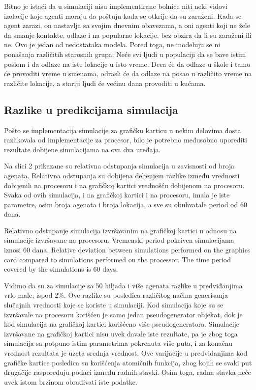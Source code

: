 Bitno je istaći da u simulaciji nisu implementirane bolnice niti neki vidovi izolacije koje agenti moraju da poštuju kada se otkrije da su zaraženi. Kada se agent zarazi, on nastavlja sa svojim dnevnim obavezama, a oni agenti koji ne žele da smanje kontakte, odlaze i na popularne lokacije, bez obzira da li su zaraženi ili ne. Ovo je jedan od nedostataka modela. Pored toga, ne modeluju se ni ponašanja različitih starosnih grupa. Neće svi ljudi u populaciji da se bave istim poslom i da odlaze na iste lokacije u isto vreme. Deca će da odlaze u škole i tamo će provoditi vreme u smenama, odrasli će da odlaze na posao u različito vreme na različite lokacije, a stariji ljudi će većinu dana provoditi u kućama.

\subsection{Razlike u predikcijama simulacija}

Pošto se implementacija simulacije za grafičku karticu u nekim delovima dosta razlikovala od implementacije za procesor, bilo je potrebno međusobno uporediti rezultate dobijene simulacijama na ova dva uređaja.

Na slici 2 prikazane su relativna odstupanja simulacija u zavisnosti od broja agenata. Relativna odstupanja su dobijena deljenjem razlike između vrednosti dobijenih na procesoru i na grafičkoj kartici vrednošću dobijenom na procesoru. Svaka od ovih simulacija, i na grafičkoj kartici i na procesoru, imala je iste parametre, osim broja agenata i broja lokacija, a sve su obuhvatale period od 60 dana.

    {Relativno odstupanje simulacija izvršavanim na grafičkoj kartici u odnosu na simulacije izvršavane na procesoru. Vremenski period pokriven simulacijama iznosi 60 dana.}
    {Relative deviation between simulations performed on the graphics card compared to simulations performed on the processor. The time period covered by the simulations is 60 days.}

Vidimo da su za simulacije sa 50 hiljada i više agenata razlike u predviđanjima vrlo male, ispod 2\%. Ove razlike su posledica različitog načina generisanja slučajnih vrednosti koje se koriste u simulaciji. Kod simulacija koje su se izvršavale na procesoru korišćen je samo jedan pseudogenerator objekat, dok je kod simulacija na grafičkoj kartici korišćeno više pseudogeneratora. Simulacije izvršavane na grafičkoj kartici nisu uvek davale iste rezultate, pa je zbog toga simulacija sa potpuno istim parametrima pokrenuta više puta, i za konačnu vrednost rezultata je uzeta srednja vrednost. Ove varijacije u predviđanjima kod grafičke kartice posledica su korišćenja atomičnih funkcija, zbog kojih se svaki put drugačije raspoređuju podaci između radnih stavki. Osim toga, radna stavka neće uvek istom brzinom obrađivati iste podatke.


